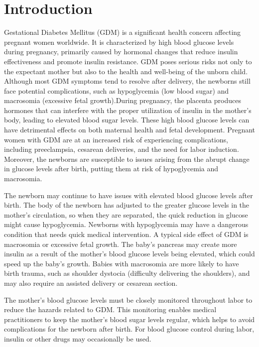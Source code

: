 \documentclass[conference,compsoc]{IEEEtran}
\begin{document}
\section{Introduction}
Gestational Diabetes Mellitus (GDM) is a significant health concern affecting pregnant women worldwide. It is characterized by high blood glucose levels during pregnancy, primarily caused by hormonal changes that reduce insulin effectiveness and promote insulin resistance. GDM poses serious risks not only to the expectant mother but also to the health and well-being of the unborn child. Although most GDM symptoms tend to resolve after delivery, the newborns still face potential complications, such as hypoglycemia (low blood sugar) and macrosomia (excessive fetal growth).During pregnancy, the placenta produces hormones that can interfere with the proper utilization of insulin in the mother's body, leading to elevated blood sugar levels. These high blood glucose levels can have detrimental effects on both maternal health and fetal development. Pregnant women with GDM are at an increased risk of experiencing complications, including preeclampsia, cesarean deliveries, and the need for labor induction. Moreover, the newborns are susceptible to issues arising from the abrupt change in glucose levels after birth, putting them at risk of hypoglycemia and macrosomia.

The newborn may continue to have issues with elevated blood glucose levels after birth. The body of the newborn has adjusted to the greater glucose levels in the mother's circulation, so when they are separated, the quick reduction in glucose might cause hypoglycemia. Newborns with hypoglycemia may have a dangerous condition that needs quick medical intervention. A typical side effect of GDM is macrosomia or excessive fetal growth. The baby's pancreas may create more insulin as a result of the mother's blood glucose levels being elevated, which could speed up the baby's growth. Babies with macrosomia are more likely to have birth trauma, such as shoulder dystocia (difficulty delivering the shoulders), and may also require an assisted delivery or cesarean section.

The mother's blood glucose levels must be closely monitored throughout labor to reduce the hazards related to GDM. This monitoring enables medical practitioners to keep the mother's blood sugar levels regular, which helps to avoid complications for the newborn after birth. For blood glucose control during labor, insulin or other drugs may occasionally be used.
\end{document}
